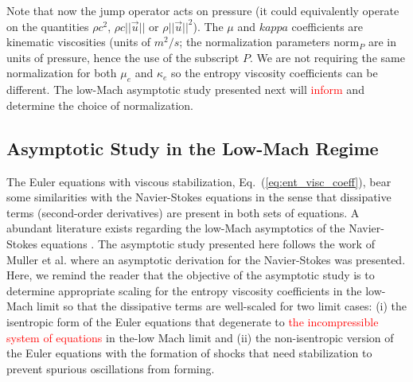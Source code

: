 \documentclass[preprint,10pt]{elsarticle}
\newcommand{\norm}{\textrm{norm}}
\newcommand{\eqt}[1]{Eq.~(\ref{#1})}                     %
\newcommand{\sct}[1]{Section~\ref{#1}}                   %
\newcommand{\tcr}[1]{\textcolor{red}{#1}}
\begin{document}
%
Note that now the jump operator acts on pressure (it could equivalently operate on the quantities $\rho c^2$, $\rho c || \vec{u} ||$ or $\rho || \vec{u} ||^2$). The $\mu$ and $kappa$ coefficients are kinematic viscosities (units of $m^2/s$; the normalization parameters $\norm_P$ are in units of pressure, hence the use of the subscript $P$.  We are not requiring the same normalization for both $\mu_e$ and $\kappa_e$ so the entropy viscosity coefficients can be different. The low-Mach asymptotic study presented next will \tcr{inform} and determine the choice of normalization.


\subsection{Asymptotic Study in the Low-Mach Regime} \label{sec:lowMach}

The Euler equations with viscous stabilization, \eqt{eq:ent_visc_coeff}, bear some similarities with the Navier-Stokes equations in the sense that dissipative terms (second-order derivatives) are present in both sets of equations. A abundant literature exists regarding the low-Mach asymptotics of the Navier-Stokes equations \cite{LowMach1, LowMach2, LowMach3, Muller}.   
%
The asymptotic study presented here follows the work of Muller et al. \cite{Muller} where an asymptotic derivation for the Navier-Stokes  was presented. Here, we remind the reader that the objective of the asymptotic study is to determine appropriate scaling for the entropy viscosity coefficients in the low-Mach limit so that the dissipative terms are well-scaled for two limit cases: (i) the isentropic form of the Euler equations that degenerate to \tcr{the incompressible system of equations} in the-low Mach limit and (ii) the non-isentropic version of the Euler equations with the formation of shocks that need stabilization to prevent spurious oscillations from forming.
\end{document}
